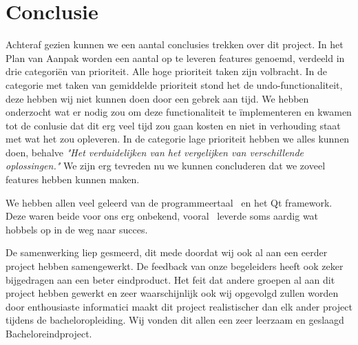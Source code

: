 \section{Conclusie}
Achteraf gezien kunnen we een aantal conclusies trekken over dit project. In het Plan van Aanpak worden een aantal op te leveren features genoemd, verdeeld in drie categori\"en van prioriteit. Alle hoge prioriteit taken zijn volbracht. In de categorie met taken van gemiddelde prioriteit stond het de undo-functionaliteit, deze hebben wij niet kunnen doen door een gebrek aan tijd. We hebben onderzocht wat er nodig zou om deze functionaliteit te \"implementeren en kwamen tot de conlusie dat dit erg veel tijd zou gaan kosten en niet in verhouding staat met wat het zou opleveren. In de categorie lage prioriteit hebben we alles kunnen doen, behalve \emph{"Het verduidelijken van het vergelijken van verschillende oplossingen."} We zijn erg tevreden nu we kunnen concluderen dat we zoveel features hebben kunnen maken.

We hebben allen veel geleerd van de programmeertaal \cpp\ en het Qt framework. Deze waren beide voor ons erg onbekend, vooral \cpp\ leverde soms aardig wat hobbels op in de weg naar succes. 

De samenwerking liep gesmeerd, dit mede doordat wij ook al aan een eerder project hebben samengewerkt. De feedback van onze begeleiders heeft ook zeker bijgedragen aan een beter eindproduct. Het feit dat andere groepen al aan dit project hebben gewerkt en zeer waarschijnlijk ook wij opgevolgd zullen worden door enthousiaste informatici maakt dit project realistischer dan elk ander project tijdens de bacheloropleiding. Wij vonden dit allen een zeer leerzaam en geslaagd Bacheloreindproject.
